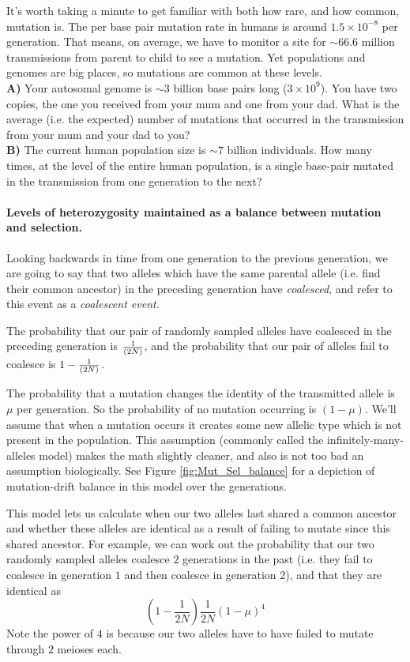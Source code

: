 \begin{question}
It's worth taking a minute to get familiar with both how rare, and how common, mutation is. The per base pair mutation rate in humans is around $1.5 \times 10^{-8}$ per generation. That means, on average, we have to monitor a site for $\sim 66.6$ million transmissions from parent to child to see a mutation. Yet populations and genomes are big places, so mutations are common at these levels. \\
{\bf A)} Your autosomal genome is $\sim 3$ billion base pairs long ($3 \times 10^9$). You have two copies, the one you received from your mum and one from your dad. What is the average (i.e. the expected) number of mutations that occurred in the transmission from your mum and your dad to you?\\
{\bf B)} The current human population size is $\sim 7$ billion individuals. How many times, at the level of the entire human population, is a single base-pair mutated in the transmission from one generation to the next?
\end{question}
\paragraph{Levels of heterozygosity maintained as a balance between mutation and selection.}


Looking backwards in time from one generation to the previous generation, we are going to say that two alleles which have the same parental allele (i.e. find their common ancestor) in the preceding generation have \emph{coalesced}, and refer to this
event as a \emph{coalescent event}.

The probability that our pair of randomly sampled alleles have coalesced in the
preceding generation is $\nicefrac{1}{(2N)}$, and the probability that our pair of
alleles fail to coalesce is $1-\nicefrac{1}{(2N)}$.

The probability that a mutation changes the identity of the
transmitted allele is $\mu$ per generation. So the probability of no
mutation occurring is $(1-\mu)$. We'll assume that when a mutation
occurs it creates some new allelic type which is not present in the
population. This assumption (commonly called the infinitely-many-alleles model) makes the math slightly cleaner, and also
is not too bad an assumption biologically. See Figure
\ref{fig:Mut_Sel_balance} for a depiction of mutation-drift balance in
this model over the generations.

This model lets us calculate when our two alleles last shared a common
ancestor and whether these alleles are identical as a result of
failing to mutate since this shared ancestor.  For example, we can work out the probability that our
two randomly sampled alleles coalesce $2$ generations in the past
(i.e. they fail to coalesce in generation $1$ and then coalesce in
generation $2$), and
that they are identical as
\begin{equation}
\left(1- \frac{1}{2N} \right) \frac{1}{2N} (1-\mu)^4
\end{equation}
Note the power of $4$ is because our two alleles have to have failed
to mutate through $2$ meioses each.

